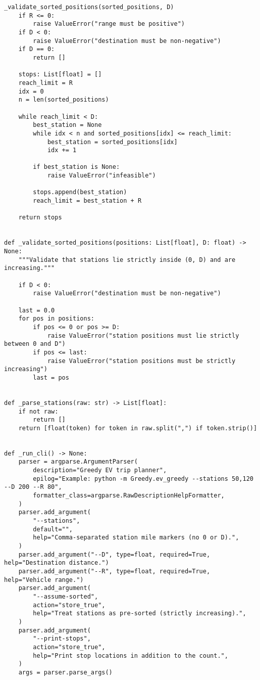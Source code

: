 \begin{lstlisting}[caption={Greedy EV planner implementation},label={lst:ev-greedy}]
    _validate_sorted_positions(sorted_positions, D)
    if R <= 0:
        raise ValueError("range must be positive")
    if D < 0:
        raise ValueError("destination must be non-negative")
    if D == 0:
        return []

    stops: List[float] = []
    reach_limit = R
    idx = 0
    n = len(sorted_positions)

    while reach_limit < D:
        best_station = None
        while idx < n and sorted_positions[idx] <= reach_limit:
            best_station = sorted_positions[idx]
            idx += 1

        if best_station is None:
            raise ValueError("infeasible")

        stops.append(best_station)
        reach_limit = best_station + R

    return stops


def _validate_sorted_positions(positions: List[float], D: float) -> None:
    """Validate that stations lie strictly inside (0, D) and are increasing."""

    if D < 0:
        raise ValueError("destination must be non-negative")

    last = 0.0
    for pos in positions:
        if pos <= 0 or pos >= D:
            raise ValueError("station positions must lie strictly between 0 and D")
        if pos <= last:
            raise ValueError("station positions must be strictly increasing")
        last = pos


def _parse_stations(raw: str) -> List[float]:
    if not raw:
        return []
    return [float(token) for token in raw.split(",") if token.strip()]


def _run_cli() -> None:
    parser = argparse.ArgumentParser(
        description="Greedy EV trip planner",
        epilog="Example: python -m Greedy.ev_greedy --stations 50,120 --D 200 --R 80",
        formatter_class=argparse.RawDescriptionHelpFormatter,
    )
    parser.add_argument(
        "--stations",
        default="",
        help="Comma-separated station mile markers (no 0 or D).",
    )
    parser.add_argument("--D", type=float, required=True, help="Destination distance.")
    parser.add_argument("--R", type=float, required=True, help="Vehicle range.")
    parser.add_argument(
        "--assume-sorted",
        action="store_true",
        help="Treat stations as pre-sorted (strictly increasing).",
    )
    parser.add_argument(
        "--print-stops",
        action="store_true",
        help="Print stop locations in addition to the count.",
    )
    args = parser.parse_args()


\end{lstlisting}
